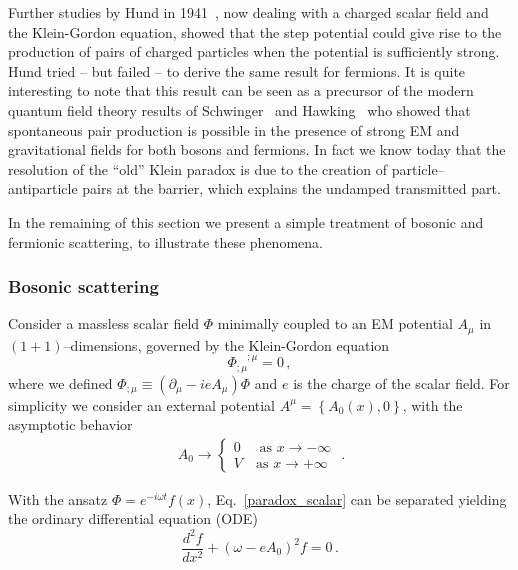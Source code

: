\documentclass[11pt]{article}
\newcommand{\be}{\begin{equation}}
\newcommand{\ee}{\end{equation}}
\newcommand{\bea}{\begin{eqnarray}}
\newcommand{\eea}{\end{eqnarray}}
\numberwithin{equation}{section} %
\begin{document}
Further studies by Hund in 1941~\cite{Hund:1941zz}, now dealing with a charged scalar field and the Klein-Gordon equation, showed that the step potential could give rise to the production of pairs of charged particles when the potential is sufficiently strong. Hund tried -- but failed -- to derive the same result for fermions. 
It is quite interesting to note that this result can be seen as a precursor of the modern quantum field theory results 
of Schwinger~\cite{Schwinger:1951nm} and Hawking~\cite{Hawking:1974sw} who showed that spontaneous pair production is 
possible in the presence of strong EM and gravitational fields for both bosons and fermions. In fact we know today that 
the resolution of the ``old'' Klein paradox is due to the creation of particle--antiparticle pairs at the barrier, which 
explains the undamped transmitted part.

In the remaining of this section we present a simple treatment of bosonic and fermionic scattering, to illustrate these phenomena. 

\subsubsection{Bosonic scattering}
Consider a massless scalar field $\Phi$ minimally coupled to an EM potential $A_{\mu}$ in $(1+1)$--dimensions, governed 
by the Klein-Gordon equation
%
\be\label{paradox_scalar}
\Phi_{;\mu}^{\phantom{;\mu};\mu}=0\,,
\ee
%
where we defined $\Phi_{;\mu}\equiv (\partial_{\mu}-i e A_{\mu})\Phi$ and $e$ is the charge of the scalar field. For simplicity we consider an external potential $A^{\mu}=\left\{A_0(x),0\right\}$, with the asymptotic behavior
%
\bea~
A_0\to \left\{\begin{array}{l}
        0 \quad \text{ as}\,\, x\to-\infty \\
        V \quad \text{as}\,\, x\to+\infty
       \end{array}\right. \,
\,.\label{potential_Klein}
\eea
%

With the ansatz $\Phi=e^{-i\omega t}f(x)$, Eq.~\eqref{paradox_scalar} can be separated yielding the ordinary differential equation (ODE)
%
\be\label{ODE_boson_paradox}
\frac{d^2f}{dx^2}+\left(\omega-e A_0\right)^2f=0\,.
\ee
%
\end{document}
